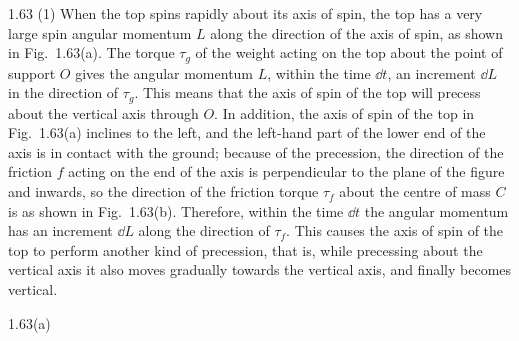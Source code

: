 \begin{solution}{1.63}
(1) When the top spins rapidly about its axis of spin, the top has a very large spin angular momentum $L$ along the direction of the axis of spin, as shown in Fig.~1.63(a). The torque $\tau_g$ of the weight acting on the top about the point of support $O$ gives the angular momentum $L$, within the time $\dd t$, an increment $\dd L$ in the direction of $\tau_g$. This means that the axis of spin of the top will precess about the vertical axis through $O$. In addition, the axis of spin of the top in Fig.~1.63(a) inclines to the left, and the left-hand part of the lower end of the axis is in contact with the ground; because of the precession, the direction of the friction $f$ acting on the end of the axis is perpendicular to the plane of the figure and inwards, so the direction of the friction torque $\tau_f$ about the centre of mass $C$ is as shown in Fig.~1.63(b). Therefore, within the time $\dd t$ the angular momentum has an increment $\dd L$ along the direction of $\tau_f$. This causes the axis of spin of the top to perform another kind of precession, that is, while precessing about the vertical axis it also moves gradually towards the vertical axis, and finally becomes vertical.

\begin{figbox}{1.63(a)}
\end{figbox}


\end{solution}
